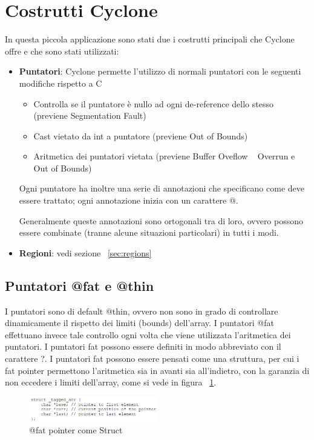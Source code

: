 \section{Costrutti Cyclone}
In questa piccola applicazione sono stati due i costrutti principali che Cyclone offre e che sono stati utilizzati:
\begin{itemize}
	\item \textbf{Puntatori}: Cyclone permette l'utilizzo di normali puntatori con le seguenti modifiche rispetto a C
	\begin{itemize}
		\item Controlla se il puntatore è nullo ad ogni de-reference dello stesso (previene Segmentation
		Fault)
		\item Cast vietato da int a puntatore (previene Out of Bounds)
		\item Aritmetica dei puntatori vietata (previene Buffer Oveflow ~ Overrun e Out of Bounds)
	\end{itemize}
	Ogni puntatore ha inoltre una serie di annotazioni che specificano come deve essere trattato;
	ogni annotazione inizia con un carattere @. 
	
	Generalmente queste annotazioni sono ortogonali tra di loro, ovvero possono essere combinate (tranne alcune situazioni particolari) in tutti i modi.
	\item \textbf{Regioni}: vedi sezione ~\ref{sec:regions}
\end{itemize}
\subsection{Puntatori @fat e @thin}
I puntatori sono di default @thin, ovvero non sono in grado di controllare dinamicamente il
rispetto dei limiti (bounds) dell’array. I puntatori @fat effettuano invece tale controllo ogni
volta che viene utilizzata l’aritmetica dei puntatori. I puntatori fat possono essere definiti in
modo abbreviato con il carattere ?.
I puntatori fat possono essere pensati come una struttura, per cui i fat pointer permettono l’aritmetica sia in avanti sia all’indietro, con la garanzia di non eccedere i limiti dell’array, come si vede in figura ~\ref{fig:fatStruct}.

\begin{figure}[h]
	\centering
	\includegraphics[width=0.5\textwidth]{Immagini/FatPointerStruct.png}
	\caption{@fat pointer come Struct}
	\label{fig:fatStruct}
\end{figure}

